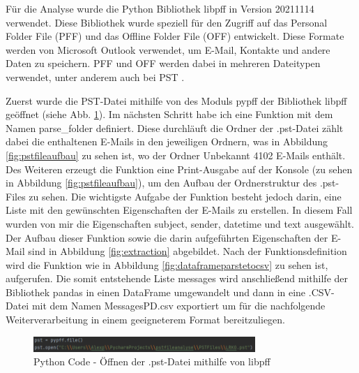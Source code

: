 Für die Analyse wurde die Python Bibliothek \glqq{}libpff\grqq{} in Version 20211114 verwendet. Diese Bibliothek wurde speziell für den Zugriff auf das Personal Folder File (PFF) und das Offline Folder File (OFF) entwickelt. Diese Formate werden von Microsoft Outlook verwendet, um E-Mail, Kontakte und andere Daten zu speichern. PFF und OFF werden dabei in mehreren Dateitypen verwendet, unter anderem auch bei PST \cite{GitHub.26.06.2022}.

Zuerst wurde die PST-Datei mithilfe von des Moduls pypff der Bibliothek libpff geöffnet (siehe Abb. \ref{fig:fileopen}). Im nächsten Schritt habe ich eine Funktion mit dem Namen parse\_folder definiert. Diese durchläuft die Ordner der .pst-Datei zählt dabei die enthaltenen E-Mails in den jeweiligen Ordnern, was in Abbildung \ref{fig:pstfileaufbau} zu sehen ist, wo der Ordner Unbekannt 4102 E-Mails enthält. Des Weiteren erzeugt die Funktion eine Print-Ausgabe auf der Konsole (zu sehen in Abbildung \ref{fig:pstfileaufbau}), um den Aufbau der Ordnerstruktur des .pst-Files zu sehen. Die wichtigste Aufgabe der Funktion besteht jedoch darin, eine Liste mit den gewünschten Eigenschaften der E-Mails zu erstellen. In diesem Fall wurden von mir die Eigenschaften \glqq{}subject\grqq{}, \glqq{}sender\grqq{}, \glqq{}datetime\grqq{} und \glqq{}text\grqq{} ausgewählt. Der Aufbau dieser Funktion sowie die darin aufgeführten Eigenschaften der E-Mail sind in Abbildung \ref{fig:extraction} abgebildet. Nach der Funktionsdefinition wird die Funktion wie in Abbildung \ref{fig:dataframeparstetocsv} zu sehen ist, aufgerufen. Die somit entstehende Liste \glqq{}messages\grqq{} wird anschließend mithilfe der Bibliothek pandas in einen DataFrame umgewandelt und dann in eine .CSV-Datei mit dem Namen \glqq{}MessagesPD.csv\grqq{} exportiert um für die nachfolgende Weiterverarbeitung in einem geeigneterem Format bereitzuliegen.

\begin{figure}
    \centering
    \includegraphics[width=0.75\textwidth]{images/File_open_libpff.PNG}
    \caption{Python Code - Öffnen der .pst-Datei mithilfe von libpff} 
    \label{fig:fileopen}
\end{figure}

